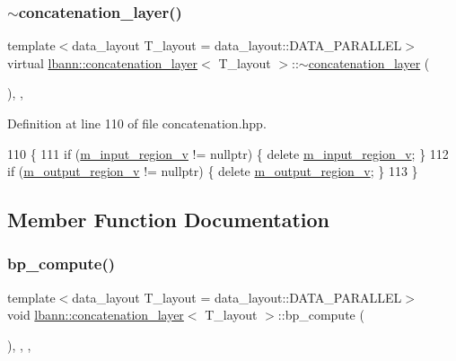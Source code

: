 \subsubsection{\texorpdfstring{$\sim$concatenation\+\_\+layer()}{~concatenation\_layer()}}
{\footnotesize\ttfamily template$<$data\+\_\+layout T\+\_\+layout = data\+\_\+layout\+::\+D\+A\+T\+A\+\_\+\+P\+A\+R\+A\+L\+L\+EL$>$ \\
virtual \hyperlink{classlbann_1_1concatenation__layer}{lbann\+::concatenation\+\_\+layer}$<$ T\+\_\+layout $>$\+::$\sim$\hyperlink{classlbann_1_1concatenation__layer}{concatenation\+\_\+layer} (\begin{DoxyParamCaption}{ }\end{DoxyParamCaption})\hspace{0.3cm}{\ttfamily [inline]}, {\ttfamily [override]}, {\ttfamily [virtual]}}



Definition at line 110 of file concatenation.\+hpp.


\begin{DoxyCode}
110                                           \{
111     \textcolor{keywordflow}{if} (\hyperlink{classlbann_1_1concatenation__layer_afa68f2e5d3ea2de57f4974a37c01fc7b}{m\_input\_region\_v} != \textcolor{keyword}{nullptr})  \{ \textcolor{keyword}{delete} \hyperlink{classlbann_1_1concatenation__layer_afa68f2e5d3ea2de57f4974a37c01fc7b}{m\_input\_region\_v}; \}
112     \textcolor{keywordflow}{if} (\hyperlink{classlbann_1_1concatenation__layer_af141bf9cf1569121a65a68e4ae97855c}{m\_output\_region\_v} != \textcolor{keyword}{nullptr}) \{ \textcolor{keyword}{delete} 
      \hyperlink{classlbann_1_1concatenation__layer_af141bf9cf1569121a65a68e4ae97855c}{m\_output\_region\_v}; \}
113   \}
\end{DoxyCode}


\subsection{Member Function Documentation}
\mbox{\label{classlbann_1_1concatenation__layer_abd2a2a3aa260646c98d842993fee6247}} 
\subsubsection{\texorpdfstring{bp\+\_\+compute()}{bp\_compute()}}
{\footnotesize\ttfamily template$<$data\+\_\+layout T\+\_\+layout = data\+\_\+layout\+::\+D\+A\+T\+A\+\_\+\+P\+A\+R\+A\+L\+L\+EL$>$ \\
void \hyperlink{classlbann_1_1concatenation__layer}{lbann\+::concatenation\+\_\+layer}$<$ T\+\_\+layout $>$\+::bp\+\_\+compute (\begin{DoxyParamCaption}{ }\end{DoxyParamCaption})\hspace{0.3cm}{\ttfamily [inline]}, {\ttfamily [override]}, {\ttfamily [protected]}, {\ttfamily [virtual]}}

